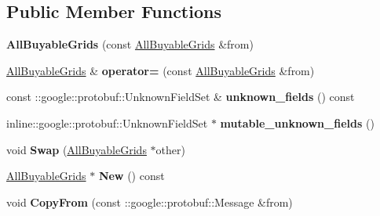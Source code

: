 \subsection*{Public Member Functions}
\begin{DoxyCompactItemize}
\item 
\hypertarget{classmonopoly_1_1_all_buyable_grids_ad5c626e94fd7ae08a0444dabe47205ac}{}{\bfseries All\+Buyable\+Grids} (const \hyperlink{classmonopoly_1_1_all_buyable_grids}{All\+Buyable\+Grids} \&from)\label{classmonopoly_1_1_all_buyable_grids_ad5c626e94fd7ae08a0444dabe47205ac}

\item 
\hypertarget{classmonopoly_1_1_all_buyable_grids_a596c97cfdb580626cf5ae36ed14a8f1e}{}\hyperlink{classmonopoly_1_1_all_buyable_grids}{All\+Buyable\+Grids} \& {\bfseries operator=} (const \hyperlink{classmonopoly_1_1_all_buyable_grids}{All\+Buyable\+Grids} \&from)\label{classmonopoly_1_1_all_buyable_grids_a596c97cfdb580626cf5ae36ed14a8f1e}

\item 
\hypertarget{classmonopoly_1_1_all_buyable_grids_a06e310542bd4a45fc8d280e57d76ad34}{}const \+::google\+::protobuf\+::\+Unknown\+Field\+Set \& {\bfseries unknown\+\_\+fields} () const \label{classmonopoly_1_1_all_buyable_grids_a06e310542bd4a45fc8d280e57d76ad34}

\item 
\hypertarget{classmonopoly_1_1_all_buyable_grids_ae0ac8e5dc1d4f31505cae029a01045e8}{}inline\+::google\+::protobuf\+::\+Unknown\+Field\+Set $\ast$ {\bfseries mutable\+\_\+unknown\+\_\+fields} ()\label{classmonopoly_1_1_all_buyable_grids_ae0ac8e5dc1d4f31505cae029a01045e8}

\item 
\hypertarget{classmonopoly_1_1_all_buyable_grids_aa9f0a045ea327c0cbe7009dfe88184dc}{}void {\bfseries Swap} (\hyperlink{classmonopoly_1_1_all_buyable_grids}{All\+Buyable\+Grids} $\ast$other)\label{classmonopoly_1_1_all_buyable_grids_aa9f0a045ea327c0cbe7009dfe88184dc}

\item 
\hypertarget{classmonopoly_1_1_all_buyable_grids_a8dd623d2dc6e55bc70986924fe248365}{}\hyperlink{classmonopoly_1_1_all_buyable_grids}{All\+Buyable\+Grids} $\ast$ {\bfseries New} () const \label{classmonopoly_1_1_all_buyable_grids_a8dd623d2dc6e55bc70986924fe248365}

\item 
\hypertarget{classmonopoly_1_1_all_buyable_grids_a745edad202c1a6ece8d1396112fbfac4}{}void {\bfseries Copy\+From} (const \+::google\+::protobuf\+::\+Message \&from)\label{classmonopoly_1_1_all_buyable_grids_a745edad202c1a6ece8d1396112fbfac4}


\end{DoxyCompactItemize}
